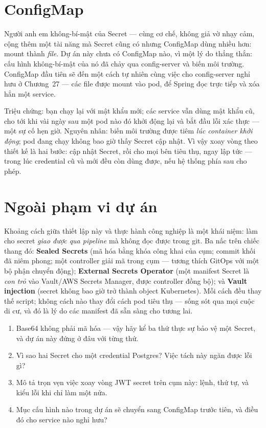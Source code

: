 \section{ConfigMap}

Người anh em không-bí-mật của Secret --- cùng cơ chế, không giả vờ nhạy
cảm, cộng thêm một tài năng mà Secret cũng có nhưng ConfigMap dùng nhiều
hơn: mount thành \emph{file}. Dự án này chưa có ConfigMap nào, vì một lý
do thẳng thắn: cấu hình không-bí-mật của nó đã chảy qua config-server và
biến môi trường. ConfigMap đầu tiên sẽ đến một cách tự nhiên cùng việc
cho config-server nghỉ hưu ở Chương~27 --- các file
 được mount vào pod, để Spring đọc trực tiếp
và xóa hẳn một service.

\begin{pitfall}
Triệu chứng: bạn chạy lại  với mật khẩu mới; các
service vẫn dùng mật khẩu cũ, cho tới khi vài ngày sau một pod nào đó
khởi động lại và bắt đầu lỗi xác thực --- một sự cố hẹn giờ.
Nguyên nhân: biến môi trường được tiêm \emph{lúc container khởi động};
pod đang chạy không bao giờ thấy Secret cập nhật. Vì vậy xoay vòng theo
thiết kế là hai bước: cập nhật Secret, rồi  cho mọi bên tiêu thụ, ngay lập tức --- trong lúc
credential cũ và mới đều còn dùng được, nếu hệ thống phía sau cho phép.
\end{pitfall}

\section{Ngoài phạm vi dự án}

Khoảng cách giữa thiết lập này và thực hành công nghiệp là một khái
niệm: làm cho secret \emph{giao được qua pipeline} mà không đọc được
trong git. Ba nấc trên chiếc thang đó: \textbf{Sealed Secrets} (mã hóa
bằng khóa công khai của cụm; commit khối đã niêm phong; một controller
giải mã trong cụm --- tương thích GitOps với một bộ phận chuyển động);
\textbf{External Secrets Operator} (một manifest Secret là
\emph{con trỏ} vào Vault/AWS Secrets Manager, được controller đồng bộ);
và \textbf{Vault injection} (secret không bao giờ trở thành object
Kubernetes). Mỗi cách đều thay thế script; không cách nào thay đổi cách
pod tiêu thụ ---  sống sót qua mọi cuộc di cư, và đó là lý
do các manifest đã sẵn sàng cho tương lai.

\begin{quiz}
\begin{enumerate}
  \item Base64 không phải mã hóa --- vậy hãy kể ba thứ thực sự bảo vệ
  một Secret, và dự án này đứng ở đâu với từng thứ.
  \item Vì sao hai Secret cho một credential Postgres? Việc tách này
  ngăn được lỗi gì?
  \item Mô tả trọn vẹn việc xoay vòng JWT secret trên cụm này: lệnh,
  thứ tự, và kiểu lỗi khi chỉ làm một nửa.
  \item Mục cấu hình nào trong dự án sẽ chuyển sang ConfigMap trước
  tiên, và điều đó cho service nào nghỉ hưu?
\end{enumerate}
\end{quiz}
